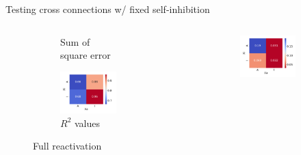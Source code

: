 \documentclass[aspectratio=169,9pt]{beamer}
\begin{document}
\begin{frame}{Testing cross connections w/ fixed self-inhibition}
\begin{columns}
\begin{column}{0.3\textwidth}
\begin{figure}[h]
\begin{subfigure}[b]{\textwidth}
                            \caption{Sum of square error}
                        \end{subfigure}
                        \begin{subfigure}[b]{\textwidth}
                            \centering
                            \includegraphics[width=\textwidth]{vary_cross-II-iPSC_timeshifted-rsq-hmap}
                            \caption{$R^2$ values}
                        \end{subfigure}
                    \caption{Full reactivation}
                \end{figure}
            \end{column}
            \pause
            \begin{column}{0.3\textwidth}
                \begin{figure}[h]
                        \centering
                        \begin{subfigure}[b]{\textwidth}
                            \centering
                            \includegraphics[width=\textwidth]{vary_cross-II-Partial_timeshifted-sse-hmap}

\end{subfigure}
\end{figure}
\end{column}
\end{columns}
\end{frame}
\end{document}
